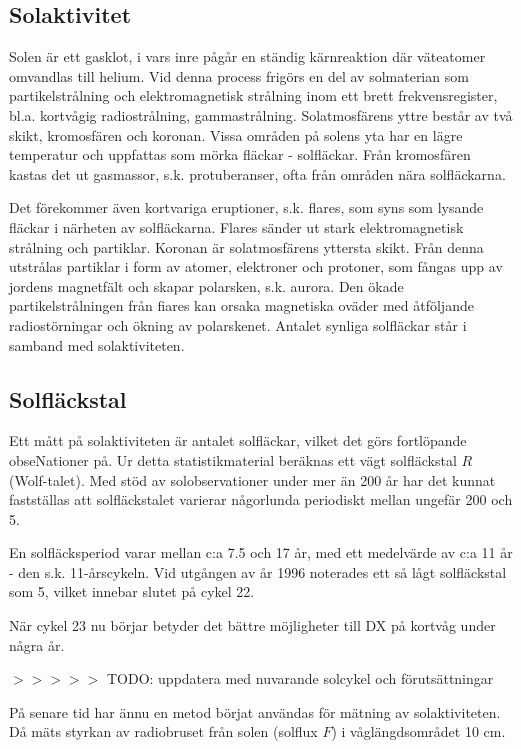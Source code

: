 \subsection{Solaktivitet}

Solen är ett gasklot, i vars inre pågår en ständig kärnreaktion där
väteatomer omvandlas till helium. Vid denna process frigörs en del av
solmaterian som partikelstrålning och elektromagnetisk strålning inom
ett brett frekvensregister, bl.a. kortvågig radiostrålning,
gammastrålning. Solatmosfärens yttre består av två skikt, kromosfären
och koronan. Vissa områden på solens yta har en lägre temperatur och
uppfattas som mörka fläckar - solfläckar. Från kromosfären kastas det
ut gasmassor, s.k. protuberanser, ofta från områden nära solfläckarna.

Det förekommer även kortvariga eruptioner, s.k. flares, som syns som
lysande fläckar i närheten av solfläckarna. Flares sänder ut stark
elektromagnetisk strålning och partiklar. Koronan är solatmosfärens
yttersta skikt. Från denna utstrålas partiklar i form av atomer,
elektroner och protoner, som fångas upp av jordens magnetfält och
skapar polarsken, s.k. aurora. Den ökade partikelstrålningen från
fiares kan orsaka magnetiska oväder med åtföljande radiostörningar och
ökning av polarskenet. Antalet synliga solfläckar står i samband med
solaktiviteten.

\subsection{Solfläckstal}

Ett mått på solaktiviteten är antalet solfläckar, vilket det görs
fortlöpande obseNationer på. Ur detta statistikmaterial beräknas ett
vägt solfläckstal \(R\) (Wolf-talet). Med stöd av solobservationer
under mer än 200 år har det kunnat fastställas att solfläckstalet
varierar någorlunda periodiskt mellan ungefär 200 och 5.

En solfläcksperiod varar mellan c:a 7.5 och 17 år, med ett medelvärde
av c:a 11 år - den s.k. 11-årscykeln. Vid utgången av år 1996
noterades ett så lågt solfläckstal som 5, vilket innebar slutet på
cykel 22.

När cykel 23 nu börjar betyder det bättre möjligheter till DX på
kortvåg under några år.

$>>>>>$ TODO: uppdatera med nuvarande solcykel och förutsättningar

På senare tid har ännu en metod börjat användas för mätning av
solaktiviteten. Då mäts styrkan av radiobruset från solen (solflux
\(F\)) i våglängdsområdet 10 cm.

